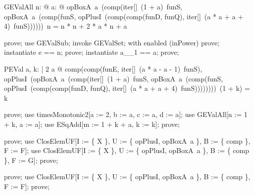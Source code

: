 \documentclass{article}
\begin{document}
\begin{theorem}{GEValAll}
  \forall n: \nat @ \forall a: \nat @ opBoxA~a~(comp(iter[\nat]~(1 + a)~funS, opBoxA~a~(comp(funS, opPlusI~(comp(comp(funD, funQ), iter[\nat]~(a * a + a + 4)~funS))))))~n = n * n + 2 * a * n + a
\end{theorem}

\begin{zproof}
prove;
use GEValSub;
invoke GEValSet;
with enabled (inPower) prove;
instantiate e == n;
prove;
instantiate a\_\_1 == a;
prove;
\end{zproof}

\begin{theorem}{PEVal}
  \forall a, k: \nat | 2 \leq a @ comp(comp(funE, iter[\nat]~(a * a - a - 1)~funS), opPlusI~(opBoxA~a~(comp(iter[\nat]~(1 + a)~funS, opBoxA~a~(comp(funS, opPlusI~(comp(comp(funD, funQ), iter[\nat]~(a * a + a + 4)~funS))))))))~(1 + k) = k
\end{theorem}

\begin{zproof}
prove;
use timesMonotonic2[a := 2, b := a, c := a, d := a];
use GEValAll[n := 1 + k, a := a];
use ESqAdd[m := 1 + k + a, k := k];
prove;
\end{zproof}


\begin{zproof}
prove;
use ClosElemUF[I := \{ X \}, U := \{ opPlusI, opBoxA~a \}, B := \{ comp \}, F := F];
use ClosElemUF[I := \{ X \}, U := \{ opPlusI, opBoxA~a \}, B := \{ comp \}, F := G];
prove;
\end{zproof}


\begin{zproof}
prove;
use ClosElemUF[I := \{ X \}, U := \{ opPlusI, opBoxA~a \}, B := \{ comp \}, F := F];
prove;
\end{zproof}
\end{document}
